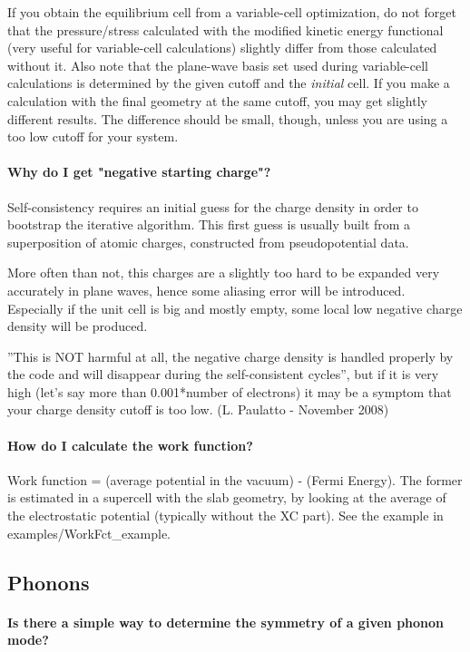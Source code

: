 \documentclass[12pt,a4paper]{article}
\begin{document}
If you obtain the equilibrium cell from a variable-cell optimization,
do not forget that the pressure/stress calculated with the modified
kinetic energy functional (very useful for variable-cell calculations)
slightly differ from those calculated without it. Also note that the
plane-wave basis set used during variable-cell calculations is
determined by the given cutoff and the {\em initial} cell. If you
make a calculation with the final geometry at the same cutoff,
you may get slightly different  results. The difference should
be small, though, unless you are using a too low cutoff for your
system.

\paragraph{Why do I get "negative starting charge"?}
Self-consistency requires an initial guess for the charge density in
order to bootstrap the iterative algorithm. This first guess is
usually built from a superposition of atomic charges, constructed from
pseudopotential data. 

More often than not, this charges are a slightly too hard to be
expanded very accurately in plane waves, hence some aliasing error
will be introduced. Especially if the unit cell is big and mostly
empty, some local low negative charge density will be produced. 

''This is NOT harmful at all, the negative charge density is handled
properly by the code and will disappear during the self-consistent
cycles'', but if it is very high (let's say more than 0.001*number of
electrons) it may be a symptom that your charge density cutoff is too
low. (L. Paulatto - November 2008)

\paragraph{How do I calculate the work function?}

Work function = (average potential in the vacuum) - (Fermi
Energy). The former is estimated in a supercell with the slab
geometry, by looking at the average of the electrostatic potential
(typically without the XC part). See the example in
examples/WorkFct\_example. 

\subsection{ Phonons }

\paragraph{ Is there a simple way to determine the symmetry of a given 
phonon mode?} 
\end{document}

